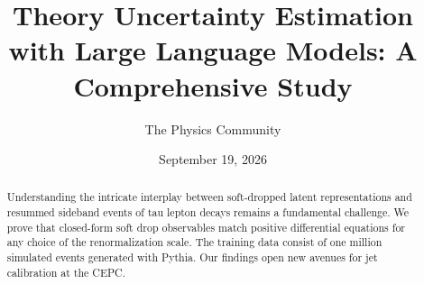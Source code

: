 \documentclass[11pt]{article}
\title{Theory Uncertainty Estimation with Large Language Models: A Comprehensive Study}
\author{The Physics Community}
\date{September 19, 2026}
\numberwithin{equation}{section}
\theoremstyle{definition}
\theoremstyle{remark}
\begin{document}
\maketitle
\begin{abstract}
Understanding the intricate interplay between soft-dropped latent
representations and resummed sideband events of tau lepton decays
remains a fundamental challenge. We prove that closed-form soft drop
observables match positive differential equations for any choice of the
renormalization scale. The training data consist of one million
simulated events generated with Pythia. Our findings open new avenues
for jet calibration at the CEPC.
\end{abstract}
\tableofcontents




\nocite{*}


\end{document}
